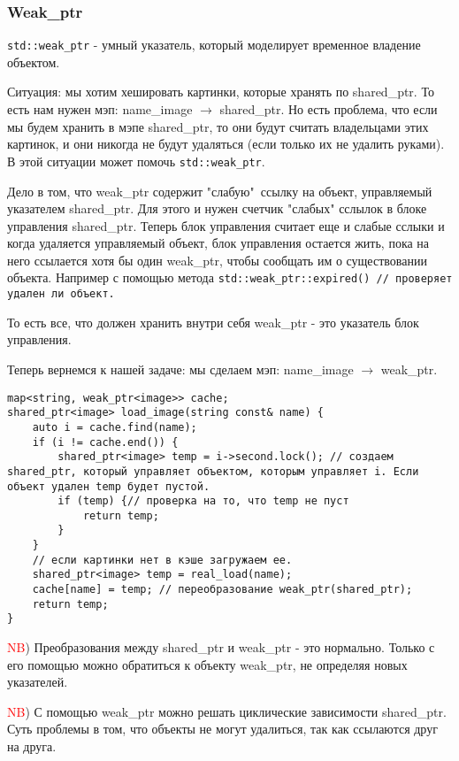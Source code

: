 \subsubsection{Weak\_ptr}
\texttt{std::weak_ptr} - умный указатель, который моделирует временное владение объектом.


Ситуация: мы хотим хешировать картинки, которые хранять по shared\_ptr. То есть нам нужен мэп: name\_image $\to$ shared\_ptr. Но есть проблема, что если мы будем хранить в мэпе shared\_ptr, то они будут считать владельцами этих картинок, и они никогда не будут удаляться (если только их не удалить руками). В этой ситуации может помочь \texttt{std::weak_ptr}.


Дело в том, что weak\_ptr содержит "слабую"\ ссылку на объект, управляемый указателем shared\_ptr. Для этого и нужен счетчик "слабых" сслылок в блоке управления shared\_ptr. Теперь блок управления считает еще и слабые сслыки и когда удаляется управляемый объект, блок управления остается жить, пока на него ссылается хотя бы один weak\_ptr, чтобы сообщать им о существовании объекта. Например с помощью метода \texttt{std::weak_ptr::expired() // проверяет удален ли объект.}


То есть все, что должен хранить внутри себя weak\_ptr - это указатель блок управления.


Теперь вернемся к нашей задаче: мы сделаем мэп: name\_image $\to$ weak\_ptr.
\begin{verbatim}
map<string, weak_ptr<image>> cache;
shared_ptr<image> load_image(string const& name) {
    auto i = cache.find(name);
    if (i != cache.end()) {
        shared_ptr<image> temp = i->second.lock(); // создаем shared_ptr, который управляет объектом, которым управляет i. Если объект удален temp будет пустой.
        if (temp) {// проверка на то, что temp не пуст
            return temp;
        }
    }
    // если картинки нет в кэше загружаем ее.
    shared_ptr<image> temp = real_load(name);
    cache[name] = temp; // переобразование weak_ptr(shared_ptr);
    return temp;
}

\end{verbatim}


\textcolor{red}{NB}) Преобразования между shared\_ptr и weak\_ptr - это нормально. Только с его помощью можно обратиться к объекту weak\_ptr, не определяя новых указателей.


\textcolor{red}{NB}) С помощью weak\_ptr можно решать циклические зависимости shared\_ptr. Суть проблемы в том, что объекты не могут удалиться, так как ссылаются друг на друга.


